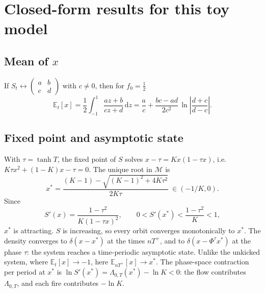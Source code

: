 \documentclass[11pt,a4paper]{article}
\theoremstyle{remark}
\newcommand{\E}{\mathbb{E}}
\newcommand{\M}{\mathcal{M}}
\newcommand{\dd}{\mathrm{d}}
\begin{document}
\section{Closed-form results for this toy model}\label{sec:closed}

\subsection{\texorpdfstring{Mean of $x$}{Mean of x}}
If $S_t\leftrightarrow\left(\begin{smallmatrix}a&b\\c&d\end{smallmatrix}\right)$
with $c\neq0$, then for $f_0=\frac12$
\begin{equation}\label{eq:exactmean}
  \E_t[x] = \frac12\int_{-1}^1 \frac{az+b}{cz+d}\,\dd z
  = \frac ac + \frac{bc-ad}{2c^2}\,\ln\left|\frac{d+c}{d-c}\right| .
\end{equation}

\subsection{Fixed point and asymptotic state}
With $\tau=\tanh T$, the fixed point of $S$ solves $x-\tau=Kx(1-\tau x)$,
i.e.\ $K\tau x^2+(1-K)x-\tau=0$. The unique root in $\M$ is
\begin{equation}
  x^* = \frac{(K-1)-\sqrt{(K-1)^2+4K\tau^2}}{2K\tau}\ \in(-1/K,0).
\end{equation}
Since
\begin{equation}
  S'(x) = \frac{1-\tau^2}{K(1-\tau x)^2},\qquad
  0<S'(x^*)<\frac{1-\tau^2}{K}<1,
\end{equation}
$x^*$ is attracting. $S$ is increasing, so every orbit converges
monotonically to $x^*$. The density converges to $\delta(x-x^*)$ at the
times $nT^+$, and to $\delta(x-\Phi^\tau x^*)$ at the phase $\tau$: the system
reaches a time-periodic asymptotic state. Unlike the unkicked system, where
$\E_t[x]\to-1$, here $\E_{nT^+}[x]\to x^*$. The phase-space contraction per
period at $x^*$ is $\ln S'(x^*)=\Lambda_{0,T}(x^*)-\ln K<0$: the flow
contributes $\Lambda_{0,T}$, and each fire contributes $-\ln K$.
\end{document}
